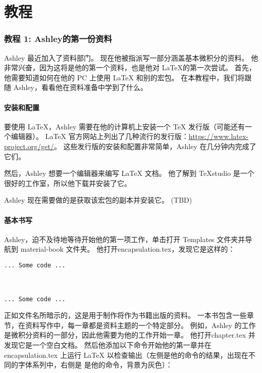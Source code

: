 \part{教程}
\section{教程 1: Ashley的第一份资料}
Ashley 最近加入了资料部门。 现在他被指派写一部分涵盖基本微积分的资料。 他非常兴奋，因为这将是他的第一个资料，也是他对 \LaTeX 的第一次尝试。 首先，他需要知道如何在他的 PC 上使用 \LaTeX{} 和别的宏包。 在本教程中，我们将跟随 Ashley，看看他在资料准备中学到了什么。

\subsection{安装和配置}
要使用 \LaTeX{}，Ashley 需要在他的计算机上安装一个 \TeX{} 发行版（可能还有一个编辑器）。 \LaTeX{} 官方网站上列出了几种流行的发行版：\url{https://www.latex-project.org/get/}。 这些发行版的安装和配置非常简单，Ashley 在几分钟内完成了它们。

然后，Ashley 想要一个编辑器来编写 \LaTeX{} 文档。 他了解到 \TeX studio 是一个很好的工作室，所以他下载并安装了它。

Ashley 现在需要做的是获取该宏包的副本并安装它。 (TBD)

\subsection{基本书写}
Ashley，迫不及待地等待开始他的第一项工作，单击打开 Templates 文件夹并导航到 material-book 文件夹。 他打开encapsulation.tex，发现它是这样的：
\begin{lstlisting}
... Some code ...



... Some code ...
\end{lstlisting}

正如文件名所暗示的，这是用于制作将作为书籍出版的资料。 一本书包含一些章节，在资料写作中，每一章都是资料主题的一个特定部分。 例如，Ashley 的工作是微积分资料的一部分，因此他需要为他的工作开始一章。 他打开chapter.tex 并发现它是一个空白文档。 然后他添加以下命令开始他的第一章并在 encapsulation.tex 上运行 \LaTeX{} 以检查输出（左侧是他的命令的结果，出现在不同的字体系列中，右侧是 是他的命令，背景为灰色）：

